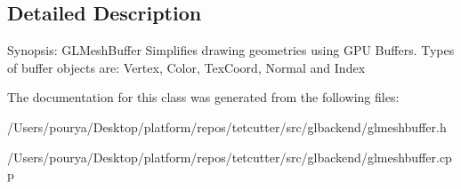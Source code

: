 

\subsection{Detailed Description}
Synopsis\+: G\+L\+Mesh\+Buffer Simplifies drawing geometries using G\+P\+U Buffers. Types of buffer objects are\+: Vertex, Color, Tex\+Coord, Normal and Index 

The documentation for this class was generated from the following files\+:\begin{DoxyCompactItemize}
\item 
/\+Users/pourya/\+Desktop/platform/repos/tetcutter/src/glbackend/glmeshbuffer.\+h\item 
/\+Users/pourya/\+Desktop/platform/repos/tetcutter/src/glbackend/glmeshbuffer.\+cpp\end{DoxyCompactItemize}
